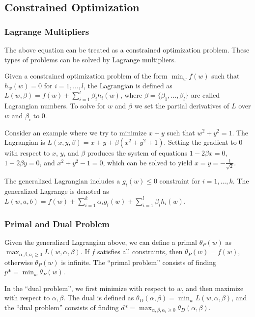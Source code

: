 \documentclass[12pt,titlepage]{article}
\begin{document}
    \subsection{Constrained Optimization}

      \subsubsection{Lagrange Multipliers}
        The above equation can be treated as a constrained optimization problem. These types of problems can be solved by Lagrange multipliers.

        Given a constrained optimization problem of the form $\min_w f(w)$ such that $h_w(w) = 0$ for $i = 1, \dots, l$, the Lagrangian is defined as
        $L(w, \beta) = f(w) + \sum_{i=1}^l \beta_i h_i(w)$, where $\beta = \{\beta_1, \dots, \beta_l\}$ are called Lagrangian numbers. To solve for $w$
        and $\beta$ we set the partial derivatives of $L$ over $w$ and $\beta_i$ to 0.

        Consider an example where we try to minimize $x + y$ such that $w^2 + y^2 = 1$. The Lagrangian is $L(x, y, \beta) = x + y + \beta(x^2 + y^2 + 1)$.
        Setting the gradient to 0 with respect to $x$, $y$, and $\beta$ produces the system of equations $1 - 2 \beta x = 0$, $1 - 2 \beta y = 0$, and
        $x^2 + y^2 - 1 = 0$, which can be solved to yield $x = y = -\frac{1}{\sqrt{2}}$.

        The generalized Lagrangian includes a $g_i(w) \leq 0$ constraint for $i = 1, \dots, k$. The generalized Lagrange is denoted as
        $L(w, a, b) = f(w) + \sum_{i=1}^k \alpha_i g_i(w) + \sum_{i=1}^l \beta_i h_i(w)$.

      \subsubsection{Primal and Dual Problem}
        Given the generalized Lagrangian above, we can define a primal $\theta_P(w)$ as $\max_{\alpha, \beta, a_i \geq 0} L(w, \alpha, \beta)$. If $f$
        satisfies all constraints, then $\theta_P(w) = f(w)$, otherwise $\theta_P(w)$ is infinite. The ``primal problem'' consists of finding
        $p* = \min_w \theta_P(w)$.

        In the ``dual problem'', we first minimize with respect to $w$, and then maximize with respect to $\alpha, \beta$. The dual is defined as
        $\theta_D(\alpha, \beta) = \min_w L(w, \alpha, \beta)$, and the ``dual problem'' consists of finding
        $d* = \max_{\alpha, \beta, \alpha_i \geq 0} \theta_D(\alpha, \beta)$.
\end{document}
